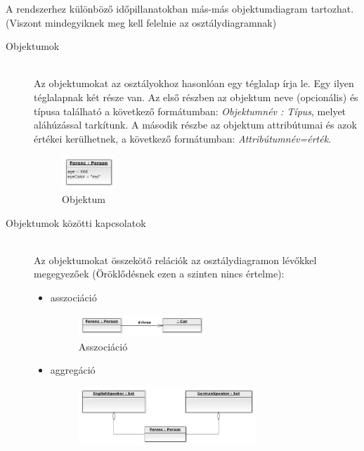 \documentclass[margin=0px]{article}
\begin{document}
A rendszerhez különböző időpillanatokban más-más objektumdiagram tartozhat. (Viszont mindegyiknek meg kell felelnie az osztálydiagramnak)

\begin{description}
    \item[Objektumok] \hfill \\
        Az objektumokat az osztályokhoz hasonlóan egy téglalap írja le. Egy ilyen téglalapnak két része van. Az első részben az objektum neve (opcionális) és típusa található a következő formátumban: \textit{Objektumnév : Típus}, melyet aláhúzással tarkítunk. A második részbe az objektum attribútumai és azok értékei kerülhetnek, a következő formátumban: \textit{Attribútumnév=érték}.
        \begin{figure}[H]
            \centering
            \includegraphics[width=0.2\textwidth]{img/objektum.png}
            \caption{Objektum}
        \end{figure}
    \item[Objektumok közötti kapcsolatok] \hfill \\
        Az objektumokat összekötő relációk az osztálydiagramon lévőkkel megegyezőek (Öröklődésnek ezen a szinten nincs értelme):
        \begin{itemize}
            \item asszociáció
                  \begin{figure}[H]
                      \centering
                      \includegraphics[width=0.5\textwidth]{img/asszociacio2.png}
                      \caption{Asszociáció}
                  \end{figure}
            \item aggregáció
                  \begin{figure}[H]
                      \centering
                      \includegraphics[width=0.7\textwidth]{img/aggregacio2.png}

\end{figure}
\end{itemize}
\end{description}
\end{document}
